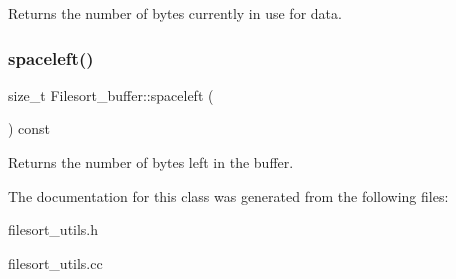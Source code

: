 \begin{DoxyReturn}{Returns}
the number of bytes currently in use for data. 
\end{DoxyReturn}
\mbox{\label{classFilesort__buffer_ad49ea9addecd96e260b3ad82b36b1739}} 
\subsubsection{\texorpdfstring{spaceleft()}{spaceleft()}}
{\footnotesize\ttfamily size\+\_\+t Filesort\+\_\+buffer\+::spaceleft (\begin{DoxyParamCaption}{ }\end{DoxyParamCaption}) const\hspace{0.3cm}{\ttfamily [inline]}}

\begin{DoxyReturn}{Returns}
the number of bytes left in the buffer. 
\end{DoxyReturn}


The documentation for this class was generated from the following files\+:\begin{DoxyCompactItemize}
\item 
filesort\+\_\+utils.\+h\item 
filesort\+\_\+utils.\+cc\end{DoxyCompactItemize}

